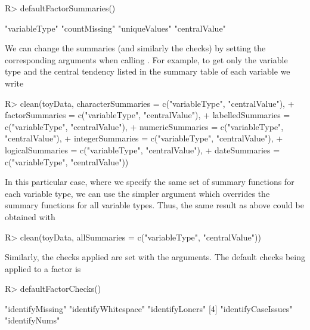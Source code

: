 \documentclass[article,shortnames]{jss}
\begin{document}
\begin{Schunk}
\begin{Sinput}
R> defaultFactorSummaries()
\end{Sinput}
\begin{Soutput}
[1] "variableType" "countMissing" "uniqueValues" "centralValue"
\end{Soutput}
\end{Schunk}

We can change the summaries (and similarly the checks) by setting the
corresponding arguments when calling . For example, to get
only the variable type and the central tendency listed in the summary
table of each variable we write

\begin{Schunk}
\begin{Sinput}
R> clean(toyData, characterSummaries = c("variableType", "centralValue"),
+    factorSummaries = c("variableType", "centralValue"),
+    labelledSummaries = c("variableType", "centralValue"),
+    numericSummaries = c("variableType", "centralValue"),
+    integerSummaries = c("variableType", "centralValue"),
+    logicalSummaries = c("variableType", "centralValue"),
+    dateSummaries = c("variableType", "centralValue"))
\end{Sinput}
\end{Schunk}

In this particular case, where we specify the same set of summary
functions for each variable type, we can use the simpler argument
 which overrides the summary functions for all
variable types. Thus, the same result as above could be obtained with

\begin{Schunk}
\begin{Sinput}
R> clean(toyData, allSummaries = c("variableType", "centralValue"))
\end{Sinput}
\end{Schunk}

Similarly, the checks applied are set with the 
arguments. The default checks being applied to a factor is

\begin{Schunk}
\begin{Sinput}
R> defaultFactorChecks()
\end{Sinput}
\begin{Soutput}
[1] "identifyMissing"    "identifyWhitespace" "identifyLoners"    
[4] "identifyCaseIssues" "identifyNums"      
\end{Soutput}
\end{Schunk}
\end{document}
